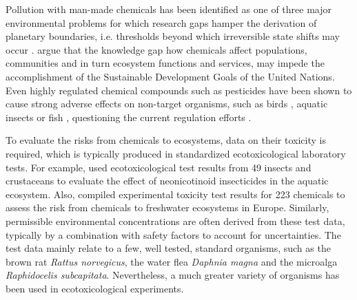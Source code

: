 \documentclass[journal,datadescriptor,accept,moreauthors,pdftex]{Definitions/mdpi}
\begin{document}
Pollution with man-made chemicals has been identified as one of three major environmental problems for which research gaps hamper the derivation of planetary boundaries, i.e. thresholds beyond which irreversible state shifts may occur \citep{steffen_anthropocene_2007, steffen_planetary_2015}. \citet{bernhardt_synthetic_2017} argue that the knowledge gap how chemicals affect populations, communities and in turn ecosystem functions and services, may impede the accomplishment of the Sustainable Development Goals \citep{rosa_transforming_2017} of the United Nations. Even highly regulated chemical compounds such as pesticides have been shown to cause strong adverse effects on non-target organisms, such as birds \citep{hallmann_declines_2014}, aquatic insects \citep{beketov_pesticides_2013} or fish \citep{yamamuro_neonicotinoids_2019}, questioning the current regulation efforts \citep{schafer_future_2019}.

To evaluate the risks from chemicals to ecosystems, data on their toxicity is required, which is typically produced in standardized ecotoxicological laboratory tests. For example, \citet{morrissey_neonicotinoid_2015} used ecotoxicological test results from 49 insects and crustaceans to evaluate the effect of neonicotinoid insecticides in the aquatic ecosystem. Also, \citet{malaj_organic_2014} compiled experimental toxicity test results for 223 chemicals to assess the risk from chemicals to freshwater ecosystems in Europe. Similarly, permissible environmental concentrations are often derived from these test data, typically by a combination with safety factors to account for uncertainties. The test data mainly relate to a few, well tested, standard organisms, such as the brown rat \textit{Rattus norvegicus}, the water flea \textit{Daphnia magna} and the microalga \textit{Raphidocelis subcapitata}. Nevertheless, a much greater variety of organisms has been used in ecotoxicological experiments.
\end{document}
